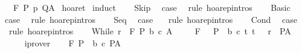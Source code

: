 \begin{isabellebody}
\ \ \ {\isachardoublequoteopen}{\isasymGamma}{\isacharcomma}{\isasymTheta}{\isasymturnstile}\isactrlbsub {\isacharslash}F\isactrlesub \ P\ p\ Q{\isacharcomma}A{\isachardoublequoteclose}\isanewline
%
\isadelimproof
%
\endisadelimproof
%
\isatagproof
{}\isamarkupfalse%
\ hoaret\isanewline
{}\isamarkupfalse%
\ {\isacharparenleft}induct{\isacharparenright}\isanewline
\ \ \isamarkupfalse%
\ Skip\ \isamarkupfalse%
\ {\isacharquery}case\ \isamarkupfalse%
\ {\isacharparenleft}rule\ hoarep{\isachardot}intros{\isacharparenright}\isanewline
{}\isamarkupfalse%
\isanewline
\ \ \isamarkupfalse%
\ Basic\ \isamarkupfalse%
\ {\isacharquery}case\ \isamarkupfalse%
\ {\isacharparenleft}rule\ hoarep{\isachardot}intros{\isacharparenright}\isanewline
{}\isamarkupfalse%
\isanewline
\ \ \isamarkupfalse%
\ Seq\ \isamarkupfalse%
\ {\isacharquery}case\ \isamarkupfalse%
\ {\isacharminus}\ {\isacharparenleft}rule\ hoarep{\isachardot}intros{\isacharparenright}\isanewline
{}\isamarkupfalse%
\isanewline
\ \ \isamarkupfalse%
\ Cond\ \isamarkupfalse%
\ {\isacharquery}case\ \isamarkupfalse%
\ {\isacharminus}\ {\isacharparenleft}rule\ hoarep{\isachardot}intros{\isacharparenright}\isanewline
{}\isamarkupfalse%
\isanewline
\ \ \isamarkupfalse%
\ {\isacharparenleft}While\ r\ {\isasymTheta}\ F\ P\ b\ c\ A{\isacharparenright}\isanewline
\ \ \isamarkupfalse%
\ {\isachardoublequoteopen}{\isasymforall}{\isasymsigma}{\isachardot}\ {\isasymGamma}{\isacharcomma}{\isasymTheta}{\isasymturnstile}\isactrlbsub {\isacharslash}F\isactrlesub \ {\isacharparenleft}{\isacharbraceleft}{\isasymsigma}{\isacharbraceright}\ {\isasyminter}\ P\ {\isasyminter}\ b{\isacharparenright}\ c\ {\isacharparenleft}{\isacharbraceleft}t{\isachardot}\ {\isacharparenleft}t{\isacharcomma}\ {\isasymsigma}{\isacharparenright}\ {\isasymin}\ r{\isacharbraceright}\ {\isasyminter}\ P{\isacharparenright}{\isacharcomma}A{\isachardoublequoteclose}\isanewline
\ \ \ \ \isamarkupfalse%
\ iprover\isanewline
\ \ \isamarkupfalse%
\ {\isachardoublequoteopen}{\isasymGamma}{\isacharcomma}{\isasymTheta}{\isasymturnstile}\isactrlbsub {\isacharslash}F\isactrlesub \ {\isacharparenleft}P\ {\isasyminter}\ b{\isacharparenright}\ c\ P{\isacharcomma}A{\isachardoublequoteclose}\isanewline
\ \ \ \ \isamarkupfalse%

\end{isabellebody}
